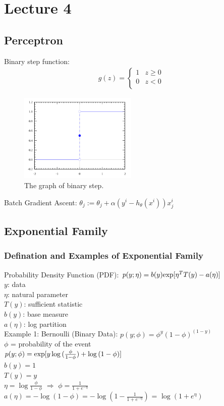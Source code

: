 \documentclass{article}
\begin{document}
\section{Lecture 4}
\subsection{Perceptron}
Binary step function: 
\begin{align}
  g(z)=
      \begin{cases}
      1 & z \geq 0 \\
      0 & z < 0 \\
      \end{cases}
\end{align}
\begin{figure}[H]
	\centerline{
   \includegraphics[width=0.5\textwidth]{Fig3.png}}
   \caption{The graph of binary step.}
   \label{fig:example}
\end{figure}
Batch Gradient Ascent: $\theta_j := \theta_j + \alpha(y^i-h_\theta(x^i))x_j^i$

\subsection{Exponential Family}
\subsubsection{Defination and Examples of Exponential Family}
Probability Density Function (PDF): $p(y;\eta) = b(y){\rm exp}[\eta^TT(y)-a(\eta)]$\\
$y$: data\\
$\eta$: natural parameter\\
$T(y)$: sufficient statistic\\
$b(y)$: base measure\\
$a(\eta)$: log partition\\

\noindent
Example 1:
Bernoulli (Binary Data): $p(y;\phi) = \phi^y(1-\phi)^{(1-y)}$\\
$\phi$ = probability of the event\\
$p(y;\phi) = {\rm exp}[y\log{(\frac{\phi}{1-\phi})} + \log{(1-\phi)}]$\\
$b(y) = 1$\\
$T(y) = y$\\
$\eta = \log{\frac{\phi}{1-\phi}}$ $\Rightarrow$ $\phi = \frac{1}{1 + e^{-\eta}}$ \\
$a(\eta) = -\log{(1-\phi)} = -\log{(1-\frac{1}{1 + e^{-\eta}})}$ = $\log{(1 + e^\eta)}$\\
\end{document}
